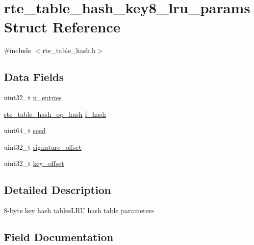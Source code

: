 \hypertarget{structrte__table__hash__key8__lru__params}{}\section{rte\+\_\+table\+\_\+hash\+\_\+key8\+\_\+lru\+\_\+params Struct Reference}
\label{structrte__table__hash__key8__lru__params}


{\ttfamily \#include $<$rte\+\_\+table\+\_\+hash.\+h$>$}

\subsection*{Data Fields}
\begin{DoxyCompactItemize}
\item 
uint32\+\_\+t \hyperlink{structrte__table__hash__key8__lru__params_aafba5a1f8ad65b41148894026098cad7}{n\+\_\+entries}
\item 
\hyperlink{rte__table__hash_8h_a6633f20f58e850abc3d1650af5d900da}{rte\+\_\+table\+\_\+hash\+\_\+op\+\_\+hash} \hyperlink{structrte__table__hash__key8__lru__params_a5a7373267cebe4384507b331c883624a}{f\+\_\+hash}
\item 
uint64\+\_\+t \hyperlink{structrte__table__hash__key8__lru__params_a13dfa5fcb8e1184f1f7756e717fd2807}{seed}
\item 
uint32\+\_\+t \hyperlink{structrte__table__hash__key8__lru__params_a255e199334632db5019afe0eb166a05a}{signature\+\_\+offset}
\item 
uint32\+\_\+t \hyperlink{structrte__table__hash__key8__lru__params_aa09132fc271bc1be2e4032587665bcf7}{key\+\_\+offset}
\end{DoxyCompactItemize}


\subsection{Detailed Description}
8-\/byte key hash tables\+L\+R\+U hash table parameters 

\subsection{Field Documentation}
\hypertarget{structrte__table__hash__key8__lru__params_a5a7373267cebe4384507b331c883624a}{}
